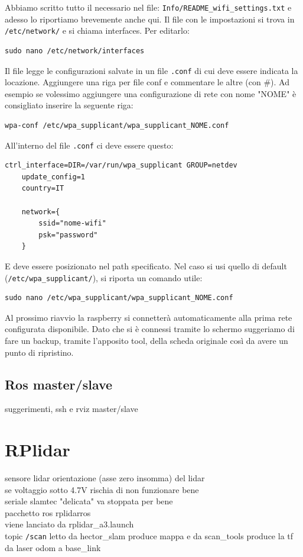 Abbiamo scritto tutto il necessario nel file: \texttt{Info/README\_wifi\_settings.txt} e adesso lo riportiamo brevemente anche qui.
Il file con le impostazioni si trova in \texttt{/etc/network/} e si chiama interfaces. Per editarlo:

\begin{lstlisting}[style=bash]
	sudo nano /etc/network/interfaces
\end{lstlisting}

Il file legge le configurazioni salvate in un file \texttt{.conf} di cui deve essere indicata la locazione. Aggiungere una riga per file conf e commentare le altre (con \#).
Ad esempio se volessimo aggiungere una configurazione di rete con nome "NOME" \`e consigliato inserire la seguente riga:

\begin{lstlisting}[style=xml]
	wpa-conf /etc/wpa_supplicant/wpa_supplicant_NOME.conf
\end{lstlisting}

All'interno del file \texttt{.conf} ci deve essere questo:
\begin{lstlisting}[style=xml]
	ctrl_interface=DIR=/var/run/wpa_supplicant GROUP=netdev
	update_config=1
	country=IT

	network={
		ssid="nome-wifi"
		psk="password"
	}
\end{lstlisting}

E deve essere posizionato nel path specificato. Nel caso si usi quello di default (\texttt{/etc/wpa\_supplicant/}), si riporta un comando utile:
\begin{lstlisting}[style=bash]
	sudo nano /etc/wpa_supplicant/wpa_supplicant_NOME.conf
\end{lstlisting}

Al prossimo riavvio la raspberry si connetter\`a automaticamente alla prima rete configurata disponibile. 
Dato che si \`e connessi tramite lo schermo suggeriamo di fare un backup, tramite l'apposito tool, della scheda originale cos\`i da avere un punto di ripristino. 

\subsection{Ros master/slave}
\label{sez: Ros master/slave}
suggerimenti, ssh e rviz master/slave \\


\section{RPlidar}
sensore lidar 
orientazione (asse zero insomma) del lidar \\
se voltaggio sotto 4.7V rischia di non funzionare bene\\
seriale slamtec "delicata" va stoppata per bene\\
pacchetto ros rplidarros\\
viene lanciato da rplidar\_a3.launch \\
topic \texttt{/scan} letto da hector\_slam produce mappa e da scan\_tools produce la tf da laser odom a base\_link \\

